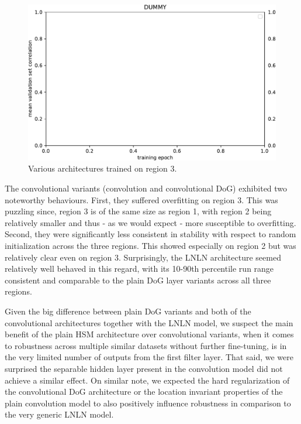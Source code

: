 \begin{figure}[H]
    \centering
    \includegraphics[width=1\textwidth]{../figures/05_dummy}
    \caption[Various architectures on region 3]{Various architectures trained on region 3.}
    \label{fig:5.3.2.1_3}
\end{figure}

The convolutional variants (convolution and convolutional DoG) exhibited two noteworthy behaviours. First, they suffered overfitting on region 3. This was puzzling since, region 3 is of the same size as region 1, with region 2 being relatively smaller and thus - as we would expect - more susceptible to overfitting. Second, they were significantly less consistent in stability with respect to random initialization across the three regions. This showed especially on region 2 but was relatively clear even on region 3. Surprisingly, the LNLN architecture seemed relatively well behaved in this regard, with its 10-90th percentile run range consistent and comparable to the plain DoG layer variants across all three regions.

Given the big difference between plain DoG variants and both of the convolutional architectures together with the LNLN model, we suspect the main benefit of the plain HSM architecture over convolutional variants, when it comes to robustness across multiple similar datasets without further fine-tuning, is in the very limited number of outputs from the first filter layer. That said, we were surprised the separable hidden layer present in the convolution model did not achieve a similar effect. On similar note, we expected the hard regularization of the convolutional DoG architecture or the location invariant properties of the plain convolution model to also positively influence robustness in comparison to the very generic LNLN model. 

